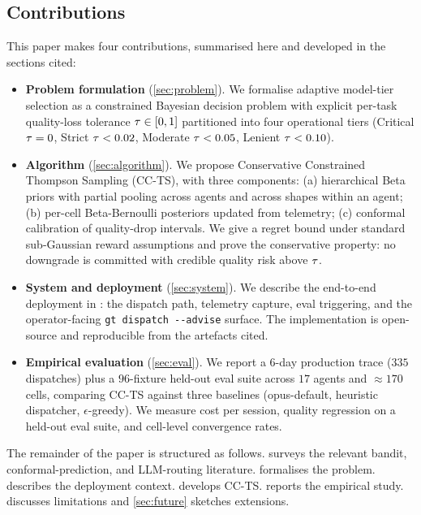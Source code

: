\subsection{Contributions}

This paper makes four contributions, summarised here and developed in the
sections cited:

\begin{itemize}[leftmargin=*]
  \item \textbf{Problem formulation} (\cref{sec:problem}). We formalise
        adaptive model-tier selection as a constrained Bayesian decision
        problem with explicit per-task quality-loss tolerance
        $\tau \in [0,1]$ partitioned into four operational tiers
        (Critical $\tau = 0$, Strict $\tau < 0.02$, Moderate
        $\tau < 0.05$, Lenient $\tau < 0.10$).
  \item \textbf{Algorithm} (\cref{sec:algorithm}). We propose Conservative
        Constrained Thompson Sampling (CC-TS), with three components:
        (a) hierarchical Beta priors with partial pooling across agents and
        across shapes within an agent; (b) per-cell Beta-Bernoulli posteriors
        updated from telemetry; (c) conformal calibration of quality-drop
        intervals. We give a regret bound under standard sub-Gaussian
        reward assumptions and prove the conservative property: no downgrade
        is committed with credible quality risk above $\tau$.
  \item \textbf{System and deployment} (\cref{sec:system}). We describe the
        end-to-end deployment in \blackrim: the dispatch path, telemetry
        capture, eval triggering, and the operator-facing
        \texttt{gt dispatch \texttt{-{}-}advise} surface. The implementation
        is open-source and reproducible from the artefacts cited.
  \item \textbf{Empirical evaluation} (\cref{sec:eval}). We report a
        $6$-day production trace ($335$ dispatches) plus a $96$-fixture held-out eval suite across $17$ agents
        and $\approx 170$ cells, comparing CC-TS against three baselines
        (opus-default, heuristic dispatcher, $\epsilon$-greedy). We measure
        cost per session, quality regression on a held-out eval suite, and
        cell-level convergence rates.
\end{itemize}

The remainder of the paper is structured as follows. 
surveys the relevant bandit, conformal-prediction, and LLM-routing
literature.  formalises the problem. 
describes the deployment context.  develops CC-TS.
 reports the empirical study.  discusses
limitations and \cref{sec:future} sketches extensions.
